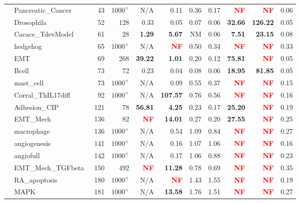 \documentclass[preprint,12pt]{elsarticle}
\newcounter{rownumber}
\newcommand\rownb{\stepcounter{rownumber}\arabic{rownumber}}
\newcommand{\change}[1]{\textcolor{red}{#1}}
\begin{document}
\begin{table}[!htb]
{\begin{tabular}{rlrrrrrrrrr}
    \rownb & Pancreatic\_Cancer~\cite{DesignPrinciplesGeneNetworks} & 43 & $1000^+$ & N/A & 0.11 & 0.36 & 0.17 & \textbf{\change{NF}} & \textbf{\change{NF}} & 0.06 \\
    \rownb & Drosophila~\cite{RodrguezVega2014} & 52 & 128 & 0.33 & 0.05 & 0.07 & 0.06 & \textbf{32.66} & \textbf{126.22} & 0.05 \\
    \rownb & Cacace\_TdevModel~\cite{Cacace2020} & 61 & 28 & \textbf{1.29} & \textbf{5.67} & NM & 0.06 & \textbf{7.51} & \textbf{23.15} & 0.08 \\
    \rownb & hedgehog~\cite{DesignPrinciplesGeneNetworks} & 65 & $1000^+$ & N/A & \textbf{\change{NF}} & 0.50 & 0.34 & \textbf{\change{NF}} & \textbf{\change{NF}} & 0.33 \\
    \rownb & EMT~\cite{Rozum2021} & 69 & 268 & \textbf{39.22} & \textbf{1.01} & 0.20 & 0.12 & \textbf{75.81} & \textbf{\change{NF}} & 0.05 \\
    \rownb & Bcell~\cite{Dutta2019} & 73 & 72 & 0.23 & 0.04 & 0.08 & 0.06 & \textbf{18.95} & \textbf{81.85} & 0.05 \\
    \rownb & mast\_cell~\cite{aghamiri2020automated} & 73 & $1000^+$ & N/A & 0.09 & 0.55 & 0.37 & \textbf{\change{NF}} & \textbf{\change{NF}} & 0.15 \\
    \rownb & Corral\_ThIL17diff~\cite{corral2021interplay} & 92 & $1000^+$ & N/A & \textbf{107.57} & 0.76 & 0.56 & \textbf{\change{NF}} & \textbf{\change{NF}} & 0.16 \\

    \midrule %
     \rownb & Adhesion\_CIP~\cite{guberman2020boolean} & 121 & 78 & \textbf{56.81} & \textbf{4.25} & 0.23 & 0.17 & \textbf{25.20} & \textbf{\change{NF}} & 0.19 \\
    \rownb & EMT\_Mech~\cite{Sullivan2022} & 136 & 82 & \textbf{\change{NF}} & \textbf{14.01} & 0.27 & 0.20 & \textbf{27.55} & \textbf{\change{NF}} & 0.25 \\
    \rownb & macrophage~\cite{DesignPrinciplesGeneNetworks} & 136 & $1000^+$ & N/A & 0.54 & 1.09 & 0.84 & \textbf{\change{NF}} & \textbf{\change{NF}} & 0.27 \\
    \rownb & angiogenesis~\cite{DesignPrinciplesGeneNetworks} & 141 & $1000^+$ & N/A & 0.16 & 1.07 & 1.06 & \textbf{\change{NF}} & \textbf{\change{NF}} & 0.16 \\
    \rownb & angiofull~\cite{Weinstein2017} & 142 & $1000^+$ & N/A & 0.17 & 1.06 & 0.88 & \textbf{\change{NF}} & \textbf{\change{NF}} & 0.23 \\
    \rownb & EMT\_Mech\_TGFbeta~\cite{Sullivan2022} & 150 & 492 & \textbf{\change{NF}} & \textbf{11.28} & 0.78 & 0.69 & \textbf{\change{NF}} & \textbf{\change{NF}} & 0.35 \\
    \rownb & RA\_apoptosis~\cite{aghamiri2020automated} & 180 & $1000^+$ & N/A & \textbf{\change{NF}} & 1.43 & 1.55 & \textbf{\change{NF}} & \textbf{\change{NF}} & 0.19 \\
    \rownb & MAPK~\cite{aghamiri2020automated} & 181 & $1000^+$ & N/A & \textbf{13.58} & 1.76 & 1.51 & \textbf{\change{NF}} & \textbf{\change{NF}} & 0.27 \\


\end{tabular}}
\end{table}
\end{document}
